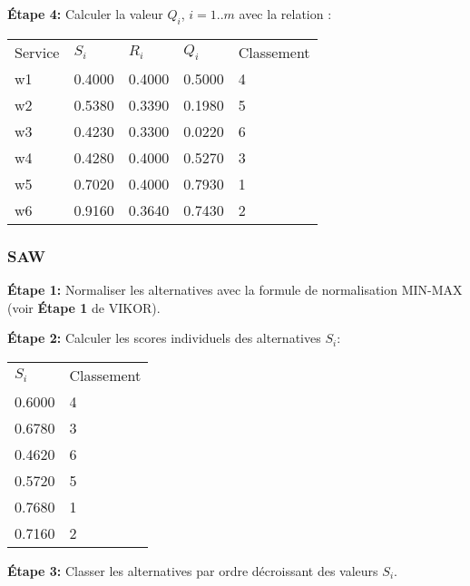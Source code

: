 \documentclass[french, 11pt, a4paper, oldfontcommands]{report}
\begin{document}
	\par
	\textbf{Étape 4:}  Calculer la valeur $Q_i$, $i = 1..m$ avec la relation : \\
	\begin{table}[ht]
		\begin{tabular}{lllll}
		\rowcolor[HTML]{9B9B9B} 
		Service & $S_i$  & $R_i$  & $Q_i$  & Classement \\
		w1      & 0.4000 & 0.4000 & 0.5000 & 4          \\
		\rowcolor[HTML]{EFEFEF} 
		w2      & 0.5380 & 0.3390 & 0.1980 & 5          \\
		w3      & 0.4230 & 0.3300 & 0.0220 & 6          \\
		\rowcolor[HTML]{EFEFEF} 
		w4      & 0.4280 & 0.4000 & 0.5270 & 3          \\
		w5      & 0.7020 & 0.4000 & 0.7930 & 1          \\
		\rowcolor[HTML]{EFEFEF} 
		w6      & 0.9160 & 0.3640 & 0.7430 & 2         
		\end{tabular}
	\end{table}
    \par
    \newpage
	\subsubsection{SAW}
	\textbf{Étape 1:} Normaliser les alternatives avec la formule de normalisation MIN-MAX (voir \textbf{Étape 1} de VIKOR). \\
	\par 
	\textbf{Étape 2:} Calculer les scores individuels des alternatives  $S_i$:
	\begin{table}[ht]
		\begin{tabular}{ll}
		\rowcolor[HTML]{9B9B9B} 
		$S_i$  & Classement \\
		0.6000 & 4          \\
		0.6780 & 3          \\
		\rowcolor[HTML]{EFEFEF} 
		0.4620 & 6          \\
		0.5720 & 5          \\
		\rowcolor[HTML]{EFEFEF} 
		0.7680 & 1          \\
		0.7160 & 2         
		\end{tabular}
	\end{table}
	\par
	\textbf{Étape 3:}  Classer les alternatives par ordre décroissant des valeurs $S_i$.
\end{document}
